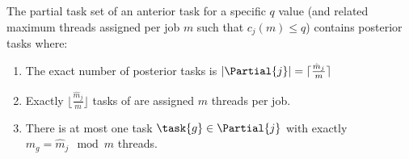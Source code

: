 \begin{prop}
  \label{prop:partial-task-set-size} The partial task set 
  of an anterior task \ants{} for a specific ${q}$ value (and related
  maximum threads assigned per job ${m}$ such that ${c_j(m) \le
    q}$) contains posterior tasks where:
  \begin{enumerate}
    \item The exact number of posterior tasks is ${|\Partial{j}| = \lceil
      \frac{\hat{m}_j}{m} \rceil}$ 
    \item Exactly ${\lfloor \frac{\hat{m}_j}{m} \rfloor}$ tasks of
       are assigned ${m}$ threads per job.
    \item There is at most one task ${\task{g} \in \Partial{j}}$ with
      exactly ${m_g = \hat{m}_j \mod m}$ threads.
  \end{enumerate}
  
\end{prop}
  

